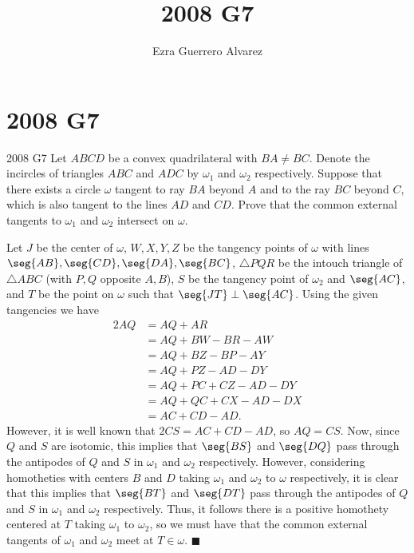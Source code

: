 \documentclass[14pt]{article}
\title{2008 G7}
\author{Ezra Guerrero Alvarez}
\begin{document}
\maketitle
	
\section*{2008 G7}

\begin{statement}{2008 G7}
	Let $ABCD$ be a convex quadrilateral with $BA \neq BC$.
	Denote the incircles of triangles $ABC$ and $ADC$
	by $\omega_1$ and $\omega_2$ respectively.
	Suppose that there exists a circle $\omega$ tangent
	to ray $BA$ beyond $A$ and to the ray $BC$ beyond $C$,
	which is also tangent to the lines $AD$ and $CD$.
	Prove that the common external tangents to
	$\omega_1$ and $\omega_2$ intersect on $\omega$.
\end{statement}
Let $J$ be the center of $\omega$, $W,X,Y,Z$ be the tangency points of $\omega$ with lines $\seg{AB},\seg{CD},\seg{DA},\seg{BC}$, $\triangle PQR$ be the intouch triangle of $\triangle ABC$ (with $P,Q$ opposite $A,B$), $S$ be the tangency point of $\omega_2$ and $\seg{AC}$, and $T$ be the point on $\omega$ such that $\seg{JT}\perp\seg{AC}$. Using the given tangencies we have
\begin{align*}
	2AQ &= AQ+AR \\
	&= AQ+BW-BR-AW \\
	&= AQ+BZ-BP-AY \\
	&= AQ+PZ-AD-DY \\
	&= AQ+PC+CZ-AD-DY \\
	&= AQ+QC+CX-AD-DX \\
	&= AC+CD-AD.
\end{align*} 
However, it is well known that $2CS=AC+CD-AD$, so $AQ=CS$. Now, since $Q$ and $S$ are isotomic, this implies that $\seg{BS}$ and $\seg{DQ}$ pass through the antipodes of $Q$ and $S$ in $\omega_1$ and $\omega_2$ respectively. However, considering homotheties with centers $B$ and $D$ taking $\omega_1$ and $\omega_2$ to $\omega$ respectively, it is clear that this implies that $\seg{BT}$ and $\seg{DT}$ pass through the antipodes of $Q$ and $S$ in $\omega_1$ and $\omega_2$ respectively. Thus, it follows there is a positive homothety centered at $T$ taking $\omega_1$ to $\omega_2$, so we must have that the common external tangents of $\omega_1$ and $\omega_2$ meet at $T\in\omega$. $\blacksquare$
	
\end{document}

